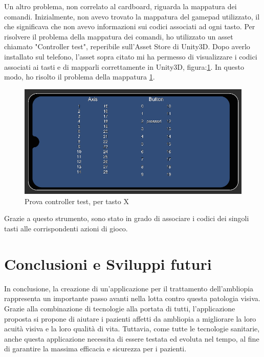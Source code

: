 \documentclass[
a4paper,
cleardoublepage=empty,
headings=twolinechapter,
numbers=autoenddot,
]{scrbook}
\begin{document}
	Un altro problema, non correlato al cardboard, riguarda la mappatura dei comandi. Inizialmente, non avevo trovato la mappatura del gamepad utilizzato, il che significava che non avevo informazioni sui codici associati ad ogni tasto.
	Per risolvere il problema della mappatura dei comandi, ho utilizzato un asset chiamato "Controller test"\cite{Controller_test}, reperibile sull'Asset Store di Unity3D. Dopo averlo installato sul telefono, l'asset sopra citato mi ha permesso di visualizzare i codici associati ai tasti e di mapparli correttamente in Unity3D, figura:\ref{fig:controller_test}. In questo modo, ho risolto il problema della mappatura \ref{fig:controller_test}.
	\begin{figure}[H]
		\centering
		\includegraphics[width=0.7\linewidth]{image/controller_test}
		\caption{Prova controller test, per tasto X}
		\label{fig:controller_test}
	\end{figure}
	Grazie a questo strumento, sono stato in grado di associare i codici dei singoli tasti alle corrispondenti azioni di gioco.
	\chapter{Conclusioni e Sviluppi futuri}
	In conclusione, la creazione di un'applicazione per il trattamento dell'ambliopia rappresenta un importante passo avanti nella lotta contro questa patologia visiva. Grazie alla combinazione di tecnologie alla portata di tutti, l'applicazione proposta si propone di aiutare i pazienti affetti da ambliopia a migliorare la loro acuità visiva e la loro qualità di vita. Tuttavia, come tutte le tecnologie sanitarie, anche questa applicazione necessita di essere testata ed evoluta nel tempo, al fine di garantire la massima efficacia e sicurezza per i pazienti.\\\\
	
\end{document}
